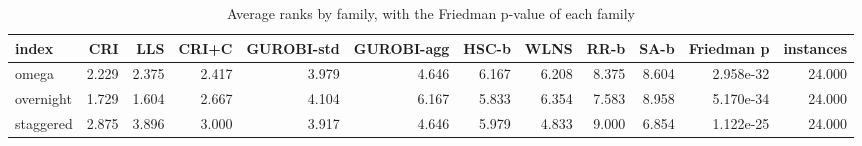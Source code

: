 \begin{table}[htbp]
\centering
\small
\caption{Average ranks by family, with the Friedman p-value of each family}
\label{tab:E4b_equal_budgets_60s_b60_ranks_by_family}
\begin{tabular}{lrrrrrrrrrrr}
\toprule
index & CRI & LLS & CRI+C & GUROBI-std & GUROBI-agg & HSC-b & WLNS & RR-b & SA-b & Friedman p & instances \\
\midrule
omega & 2.229 & 2.375 & 2.417 & 3.979 & 4.646 & 6.167 & 6.208 & 8.375 & 8.604 & 2.958e-32 & 24.000 \\
overnight & 1.729 & 1.604 & 2.667 & 4.104 & 6.167 & 5.833 & 6.354 & 7.583 & 8.958 & 5.170e-34 & 24.000 \\
staggered & 2.875 & 3.896 & 3.000 & 3.917 & 4.646 & 5.979 & 4.833 & 9.000 & 6.854 & 1.122e-25 & 24.000 \\
\bottomrule
\end{tabular}
\end{table}
